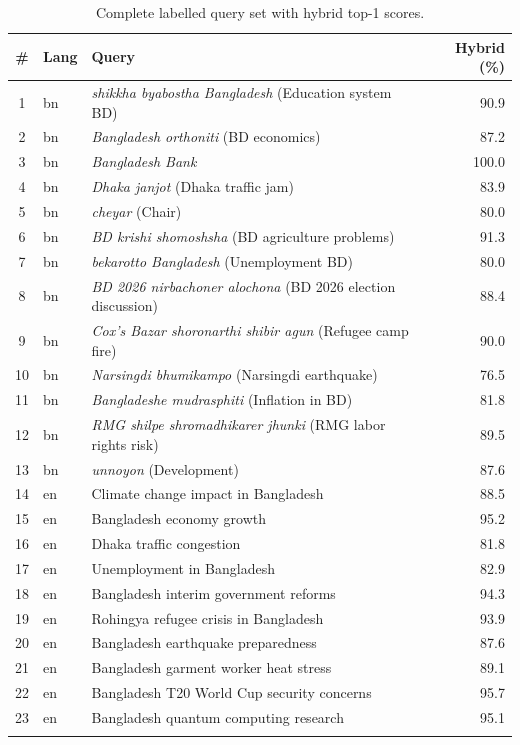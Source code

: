 \documentclass[12pt,a4paper]{article}
\newcommand{\bn}[1]{\textit{#1}}
\begin{document}
\begin{longtable}{clp{4cm}r}
\toprule
\textbf{\#} & \textbf{Lang} & \textbf{Query} & \textbf{Hybrid (\%)} \\
\midrule
\endhead
1  & bn & \bn{shikkha byabostha Bangladesh} (Education system BD) & 90.9 \\
2  & bn & \bn{Bangladesh orthoniti} (BD economics) & 87.2 \\
3  & bn & \bn{Bangladesh Bank} & 100.0 \\
4  & bn & \bn{Dhaka janjot} (Dhaka traffic jam) & 83.9 \\
5  & bn & \bn{cheyar} (Chair) & 80.0 \\
6  & bn & \bn{BD krishi shomoshsha} (BD agriculture problems) & 91.3 \\
7  & bn & \bn{bekarotto Bangladesh} (Unemployment BD) & 80.0 \\
8  & bn & \bn{BD 2026 nirbachoner alochona} (BD 2026 election discussion) & 88.4 \\
9  & bn & \bn{Cox's Bazar shoronarthi shibir agun} (Refugee camp fire) & 90.0 \\
10 & bn & \bn{Narsingdi bhumikampo} (Narsingdi earthquake) & 76.5 \\
11 & bn & \bn{Bangladeshe mudrasphiti} (Inflation in BD) & 81.8 \\
12 & bn & \bn{RMG shilpe shromadhikarer jhunki} (RMG labor rights risk) & 89.5 \\
13 & bn & \bn{unnoyon} (Development) & 87.6 \\
\midrule
14 & en & Climate change impact in Bangladesh & 88.5 \\
15 & en & Bangladesh economy growth & 95.2 \\
16 & en & Dhaka traffic congestion & 81.8 \\
17 & en & Unemployment in Bangladesh & 82.9 \\
18 & en & Bangladesh interim government reforms & 94.3 \\
19 & en & Rohingya refugee crisis in Bangladesh & 93.9 \\
20 & en & Bangladesh earthquake preparedness & 87.6 \\
21 & en & Bangladesh garment worker heat stress & 89.1 \\
22 & en & Bangladesh T20 World Cup security concerns & 95.7 \\
23 & en & Bangladesh quantum computing research & 95.1 \\
\bottomrule
\caption{Complete labelled query set with hybrid top-1 scores.}
\label{tab:labeled_queries}
\end{longtable}
\end{document}

